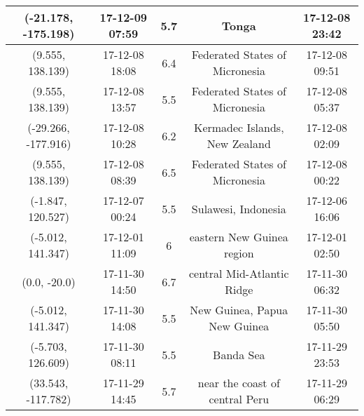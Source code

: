 \begin {table}[H]
\begin{center}
\begin{tabu}{|c c c c c|}
        (-21.178, -175.198) & 17-12-09 07:59 & 5.7 & Tonga & 17-12-08 23:42 \\ \hline
        (9.555, 138.139) & 17-12-08 18:08 & 6.4 & Federated States of Micronesia & 17-12-08 09:51 \\ \hline
        (9.555, 138.139) & 17-12-08 13:57 & 5.5 & Federated States of Micronesia & 17-12-08 05:37 \\ \hline
        (-29.266, -177.916) & 17-12-08 10:28 & 6.2 & Kermadec Islands, New Zealand & 17-12-08 02:09 \\ \hline
        (9.555, 138.139) & 17-12-08 08:39 & 6.5 & Federated States of Micronesia & 17-12-08 00:22 \\ \hline
        (-1.847, 120.527) & 17-12-07 00:24 & 5.5 & Sulawesi, Indonesia & 17-12-06 16:06 \\ \hline
        (-5.012, 141.347) & 17-12-01 11:09 & 6 & eastern New Guinea region & 17-12-01 02:50 \\ \hline
        (0.0, -20.0) & 17-11-30 14:50 & 6.7 & central Mid-Atlantic Ridge  & 17-11-30 06:32 \\ \hline
        (-5.012, 141.347) & 17-11-30 14:08 & 5.5 & New Guinea, Papua New Guinea & 17-11-30 05:50 \\ \hline
        (-5.703, 126.609) & 17-11-30 08:11 & 5.5 & Banda Sea & 17-11-29 23:53 \\ \hline
        (33.543, -117.782) & 17-11-29 14:45 & 5.7 & near the coast of central Peru & 17-11-29 06:29 \\ \hline
        \hline

    \end{tabu}
    \hspace*{-2cm}
\end{center}
\end{table}


